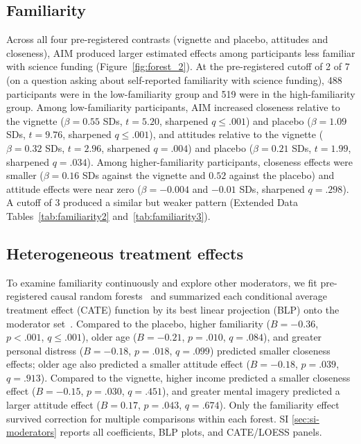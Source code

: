 \documentclass[11pt]{article}
\begin{document}
\subsection{Familiarity}
\label{sec:study-1-science-funding-familiarity}
Across all four pre-registered contrasts (vignette and placebo, attitudes and closeness), AIM produced larger estimated effects among participants less familiar with science funding (Figure~\ref{fig:forest_2}). At the pre-registered cutoff of 2 of 7 (on a question asking about self-reported familiarity with science funding), 488 participants were in the low-familiarity group and 519 were in the high-familiarity group. Among low-familiarity participants, AIM increased closeness relative to the vignette ($\beta=0.55$ SDs, $t=5.20$, sharpened $q\leq.001$) and placebo ($\beta=1.09$ SDs, $t=9.76$, sharpened $q\leq.001$), and attitudes relative to the vignette ($\beta=0.32$ SDs, $t=2.96$, sharpened $q=.004$) and placebo ($\beta=0.21$ SDs, $t=1.99$, sharpened $q=.034$). Among higher-familiarity participants, closeness effects were smaller ($\beta=0.16$ SDs against the vignette and $0.52$ against the placebo) and attitude effects were near zero ($\beta=-0.004$ and $-0.01$ SDs, sharpened $q=.298$). A cutoff of 3 produced a similar but weaker pattern (Extended Data Tables~\ref{tab:familiarity2} and~\ref{tab:familiarity3}).




\subsection{Heterogeneous treatment effects}
\label{sec:study-1-science-funding-heterogeneous-treatment-effects}



To examine familiarity continuously and explore other moderators, we fit pre-registered causal random forests~\citep{wager_estimation_2018,athey_estimating_2019} and summarized each conditional average treatment effect (CATE) function by its best linear projection (BLP) onto the moderator set~\citep{semenova_debiased_2021}. Compared to the placebo, higher familiarity ($B=-0.36$, $p<.001$, $q\leq.001$), older age ($B=-0.21$, $p=.010$, $q=.084$), and greater personal distress ($B=-0.18$, $p=.018$, $q=.099$) predicted smaller closeness effects; older age also predicted a smaller attitude effect ($B=-0.18$, $p=.039$, $q=.913$). Compared to the vignette, higher income predicted a smaller closeness effect ($B=-0.15$, $p=.030$, $q=.451$), and greater mental imagery predicted a larger attitude effect ($B=0.17$, $p=.043$, $q=.674$). Only the familiarity effect survived correction for multiple comparisons within each forest. SI \autoref{sec:si-moderators} reports all coefficients, BLP plots, and CATE/LOESS panels.
\end{document}
